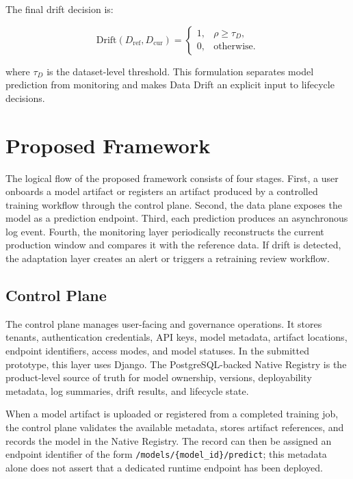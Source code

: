 \documentclass[runningheads]{llncs}
\begin{document}
The final drift decision is:

\begin{equation}
\mathrm{Drift}(D_{\mathrm{ref}}, D_{\mathrm{cur}}) =
\begin{cases}
1, & \rho \ge \tau_D,\\
0, & \text{otherwise}.
\end{cases}
\end{equation}

where $\tau_D$ is the dataset-level threshold. This formulation separates model prediction from monitoring and makes Data Drift an explicit input to lifecycle decisions.

\section{Proposed Framework}

The logical flow of the proposed framework consists of four stages. First, a user onboards a model artifact or registers an artifact produced by a controlled training workflow through the control plane. Second, the data plane exposes the model as a prediction endpoint. Third, each prediction produces an asynchronous log event. Fourth, the monitoring layer periodically reconstructs the current production window and compares it with the reference data. If drift is detected, the adaptation layer creates an alert or triggers a retraining review workflow.


\subsection{Control Plane}

The control plane manages user-facing and governance operations. It stores tenants, authentication credentials, API keys, model metadata, artifact locations, endpoint identifiers, access modes, and model statuses. In the submitted prototype, this layer uses Django. The PostgreSQL-backed Native Registry is the product-level source of truth for model ownership, versions, deployability metadata, log summaries, drift results, and lifecycle state.

When a model artifact is uploaded or registered from a completed training job, the control plane validates the available metadata, stores artifact references, and records the model in the Native Registry. The record can then be assigned an endpoint identifier of the form \texttt{/models/\{model\_id\}/predict}; this metadata alone does not assert that a dedicated runtime endpoint has been deployed.
\end{document}
